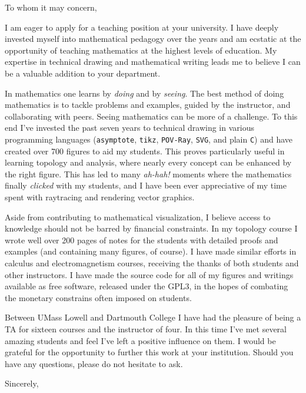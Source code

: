 \documentclass{letter}
\begin{document}
    \begin{letter}{}
        \opening{To whom it may concern,}
            I am eager to apply for a teaching position at your university.
            I have deeply invested myself into mathematical pedagogy over the
            years and am ecstatic at the opportunity of teaching mathematics
            at the highest levels of education. My expertise in technical
            drawing and mathematical writing leads me to believe I can be a
            valuable addition to your department.
            \par
            In mathematics one learns by \textit{doing} and by \textit{seeing}.
            The best method of doing mathematics is to tackle problems and
            examples, guided by the instructor, and collaborating with peers.
            Seeing mathematics can be more of a challenge. To this end I've
            invested the past seven years to technical drawing in various
            programming languages (\texttt{asymptote},
            \texttt{tikz}, \texttt{POV-Ray}, \texttt{SVG}, and plain
            \texttt{C}) and have created over 700 figures to aid my students.
            This proves particularly useful in learning topology and analysis,
            where nearly every concept can be enhanced by the right figure.
            This has led to many \textit{ah-hah!} moments where the mathematics
            finally \textit{clicked} with my students, and I have been ever
            appreciative of my time spent with raytracing and rendering
            vector graphics.
            \par
            Aside from contributing to mathematical visualization, I believe
            access to knowledge should not be barred by financial constraints.
            In my topology course I wrote well over 200 pages of notes for the
            students with detailed proofs and examples (and containing many
            figures, of course). I have made similar efforts in calculus and
            electromagnetism courses, receiving the thanks of both students
            and other instructors. I have made the source code for all of my
            figures and writings available as free software, released under the
            GPL3, in the hopes of combating the monetary constrains
            often imposed on students.
            \par
            Between UMass Lowell and Dartmouth College I have had the pleasure
            of being a TA for sixteen courses and the instructor of four. In
            this time I've met several amazing students and feel I've left a
            positive influence on them. I would be grateful
            for the opportunity to further this work at your institution.
            Should you have any questions, please do not hesitate to ask.
        \closing{Sincerely,}
    \end{letter}
\end{document}
